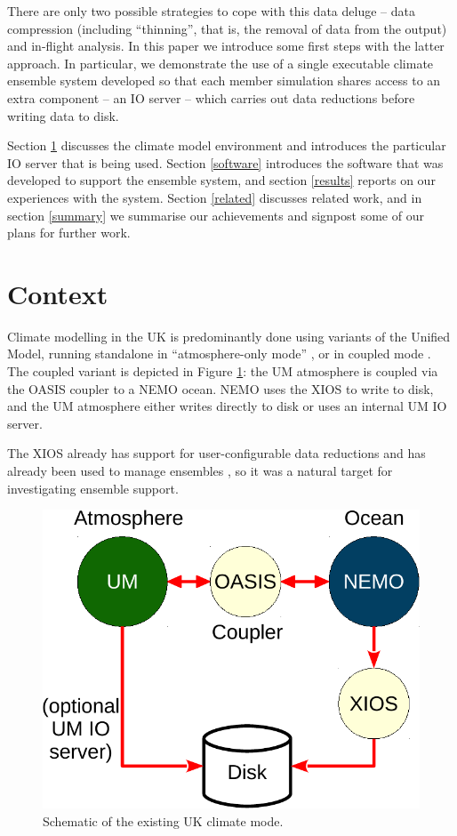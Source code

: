 \documentclass[twocolumn, 5p, times]{elsarticle}
\begin{document}
There are only two possible strategies to cope with this data deluge -- data compression (including ``thinning'', that is, the removal of data from the output) and in-flight analysis. In this paper we 
introduce some first steps with the latter approach. 
In particular, we demonstrate the use of a single executable climate ensemble system developed so that each member simulation shares access to an extra component -- an IO server -- which carries out data reductions before writing data to disk. 

Section \ref{context} discusses the climate model environment and introduces the particular IO server that is being used. Section \ref{software} introduces the software that was developed to support the ensemble system, and section \ref{results} reports on our experiences with the system. Section \ref{related} discusses related work, and in section \ref{summary} we summarise our achievements and signpost some of our plans for further work.


\section{Context}
\label{context}

Climate modelling in the UK is predominantly done using variants of the Unified Model, running standalone in ``atmosphere-only mode'' \citep{REFNEEDED}, or in coupled mode \citep{REFNEEDED}. The coupled variant is depicted in Figure \ref{coupled}: the UM atmosphere is coupled via the OASIS coupler \cite{Oasis} to a NEMO \cite{Nemo} ocean. NEMO uses the XIOS \cite{XIOS12} to write to disk, and the UM atmosphere either writes directly to disk or uses an internal UM IO server.

The XIOS already has support for user-configurable data reductions and has already been used to manage ensembles \cite{BesEA16}, so it was a natural target for investigating ensemble support.


\begin{figure}
	\centerline{
		\includegraphics[scale=0.5]{figures/xios_figures_a.pdf}
	}
	\caption{Schematic of the existing UK climate mode.}
	\label{coupled}
\end{figure}
\end{document}
